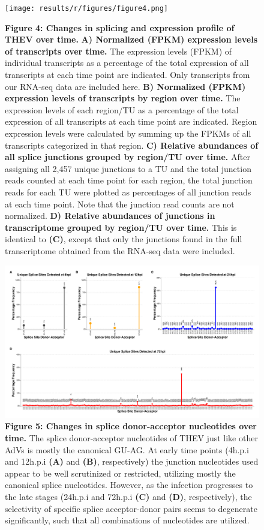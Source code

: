 \documentclass[
]{article}
\begin{document}
\begin{figure}
\centering
\texttt{[image: results/r/figures/figure4.png]}
\caption{\textbf{Figure 4: Changes in splicing and expression profile of
THEV over time.} \textbf{A) Normalized (FPKM) expression levels of
transcripts over time.} The expression levels (FPKM) of individual
transcripts as a percentage of the total expression of all transcripts
at each time point are indicated. Only transcripts from our RNA-seq data
are included here. \textbf{B) Normalized (FPKM) expression levels of
transcripts by region over time.} The expression levels of each
region/TU as a percentage of the total expression of all transcripts at
each time point are indicated. Region expression levels were calculated
by summing up the FPKMs of all transcripts categorized in that region.
\textbf{C) Relative abundances of all splice junctions grouped by
region/TU over time.} After assigning all 2,457 unique junctions to a TU
and the total junction reads counted at each time point for each region,
the total junction reads for each TU were plotted as percentages of all
junction reads at each time point. Note that the junction read counts
are not normalized. \textbf{D) Relative abundances of junctions in
transcriptome grouped by region/TU over time.} This is identical to
\textbf{(C)}, except that only the junctions found in the full
transcriptome obtained from the RNA-seq data were included.}
\end{figure}

\begin{figure}
\centering
\includegraphics{results/r/figures/figure5.png}
\caption{\textbf{Figure 5: Changes in splice donor-acceptor nucleotides
over time.} The splice donor-acceptor nucleotides of THEV just like
other AdVs is mostly the canonical GU-AG. At early time points (4h.p.i
and 12h.p.i \textbf{(A)} and \textbf{(B)}, respectively) the junction
nucleotides used appear to be well scrutinized or restricted, utilizing
mostly the canonical splice nucleotides. However, as the infection
progresses to the late stages (24h.p.i and 72h.p.i \textbf{(C)} and
\textbf{(D)}, respectively), the selectivity of specific splice
acceptor-donor pairs seems to degenerate significantly, such that all
combinations of nucleotides are utilized.}
\end{figure}
\end{document}

